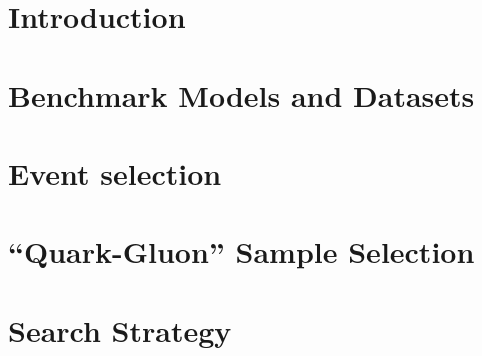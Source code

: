 \documentclass[NOTE, atlasdraft=true, texlive=2016, UKenglish]{\ATLASLATEXPATH atlasdoc}
\begin{document}
\maketitle

\tableofcontents


\section{Introduction}
\label{sec:intro}

\clearpage

\section{Benchmark Models and Datasets}
\label{sec:benchmark_signals}

\clearpage

\section{Event selection}
\label{sec:event_selection}

\clearpage


\section{``Quark-Gluon'' Sample Selection}
\label{sec:QGselection}

\clearpage


\section{Search Strategy}

\clearpage
%
%
%
%
%
%
\end{document}
